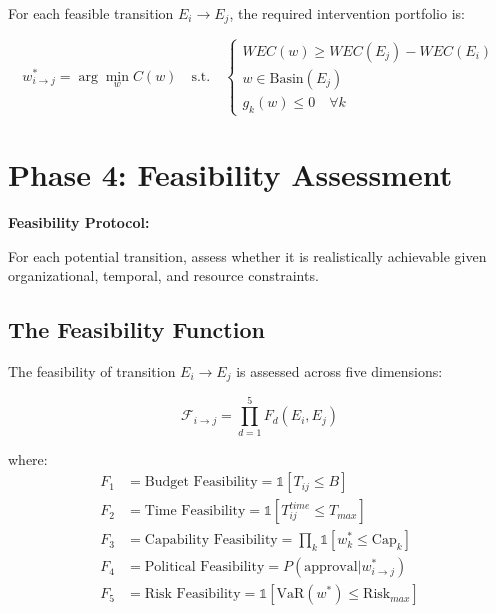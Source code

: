 For each feasible transition $E_i \to E_j$, the required intervention portfolio is:

\begin{equation}
w^*_{i \to j} = \arg\min_{w} C(w) \quad \text{s.t.} \quad
\begin{cases}
WEC(w) \geq WEC(E_j) - WEC(E_i) \\
w \in \text{Basin}(E_j) \\
g_k(w) \leq 0 \quad \forall k
\end{cases}
\end{equation}

\section{Phase 4: Feasibility Assessment}
\label{sec:meq-feasibility}

\begin{tcolorbox}[colback=green!5!white, colframe=green!75!black,
    title=Question 4: Is It Realistic?]

\textbf{Feasibility Protocol:}

For each potential transition, assess whether it is realistically achievable
given organizational, temporal, and resource constraints.

\end{tcolorbox}

\subsection{The Feasibility Function}

\begin{definition}
The feasibility of transition $E_i \to E_j$ is assessed across five dimensions:

\begin{equation}
\mathcal{F}_{i \to j} = \prod_{d=1}^{5} F_d(E_i, E_j)
\end{equation}

where:
\begin{align}
F_1 &= \text{Budget Feasibility} = \mathbb{1}[T_{ij} \leq B] \\
F_2 &= \text{Time Feasibility} = \mathbb{1}[T_{ij}^{time} \leq T_{max}] \\
F_3 &= \text{Capability Feasibility} = \prod_k \mathbb{1}[w^*_k \leq \text{Cap}_k] \\
F_4 &= \text{Political Feasibility} = P(\text{approval} | w^*_{i \to j}) \\
F_5 &= \text{Risk Feasibility} = \mathbb{1}[\text{VaR}(w^*) \leq \text{Risk}_{max}]
\end{align}
\end{definition}

